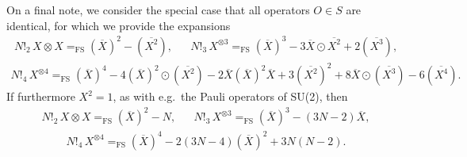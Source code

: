 \documentclass[nofootinbib,notitlepage,11pt]{revtex4-2}
\newcommand{\p}[1]{\left(#1\right)} %
\newcommand{\1}{\mathds{1}}
\newcommand{\EQFS}{=_{\text{FS}}}
\newcommand{\col}{\overline}
\begin{document}
On a final note, we consider the special case that all operators
$O\in S$ are identical, for which we provide the expansions
\begin{align}
  N!_2\, X\otimes X \EQFS \p{\col{X}}^2 - \p{\col{X^2}},
  &&
  N!_3\, X^{\otimes 3} \EQFS \p{\col{X}}^3
  - 3 \col{X} \odot \col{X^2} + 2\p{\col{X^3}},
\end{align}
\begin{align}
  N!_4\, X^{\otimes 4}
  \EQFS \p{\col{X}}^4 - 4 \p{\col{X}}^2\odot\p{\col{X^2}}
  - 2 \col{X} \p{\col{X}}^2 \col{X}
  + 3 \p{\col{X^2}}^2 + 8 \col{X} \odot \p{\col{X^3}}
  - 6 \p{\col{X^4}}.
\end{align}
If furthermore $X^2=1$, as with e.g.~the Pauli operators of SU(2),
then
\begin{align}
  N!_2\, X\otimes X \EQFS \p{\col{X}}^2 - N,
  &&
  N!_3\, X^{\otimes 3} \EQFS \p{\col{X}}^3 - \p{3N-2} \col{X},
\end{align}
\begin{align}
  N!_4\, X^{\otimes 4} \EQFS \p{\col{X}}^4
  - 2\p{3N-4} \p{\col{X}}^2 + 3 N \p{N-2}.
\end{align}


\end{document}
